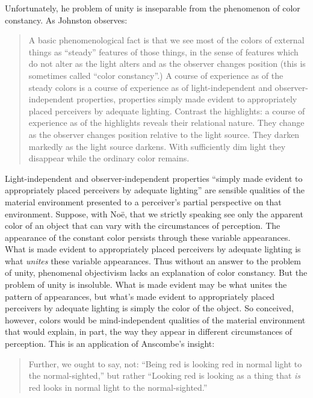 \documentclass[12pt]{article}
\begin{document}
Unfortunately, he problem of unity is inseparable from the phenomenon of color constancy. As Johnston observes: 
	\begin{quote}
		A basic phenomenological fact is that we see most of the colors of external things as ``steady'' features of those things, in the sense of features which do not alter as the light alters and as the observer changes position (this is sometimes called ``color constancy''.) A course of experience as of the steady colors is a course of experience as of light-independent and observer-independent properties, properties simply made evident to appropriately placed perceivers by adequate lighting. Contrast the highlights: a course of experience as of the highlights reveals their relational nature. They change as the observer changes position relative to the light source. They darken markedly as the light source darkens. With sufficiently dim light they disappear while the ordinary color remains. \citep[141]{Johnston:1992ck} 
	\end{quote}
Light-independent and observer-independent properties ``simply made evident to appropriately placed perceivers by adequate lighting'' are sensible qualities of the material environment presented to a perceiver's partial perspective on that environment. Suppose, with Noë, that we strictly speaking see only the apparent color of an object that can vary with the circumstances of perception. The appearance of the constant color persists through these variable appearances. What is made evident to appropriately placed perceivers by adequate lighting is what \emph{unites} these variable appearances. Thus without an answer to the problem of unity, phenomenal objectivism lacks an explanation of color constancy. But the problem of unity is insoluble. What is made evident may be what unites the pattern of appearances, but what's made evident to appropriately placed perceivers by adequate lighting is simply the color of the object. So conceived, however, colors would be mind-independent qualities of the material environment that would explain, in part, the way they appear in different circumstances of perception. This is an application of Anscombe's insight: 
	\begin{quote}
		Further, we ought to say, not: ``Being red is looking red in normal light to the normal-sighted,'' but rather ``Looking red is looking as a thing that \emph{is} red looks in normal light to the normal-sighted.'' \citep[14]{Anscombe:1981fk} 
	\end{quote}
\end{document}

